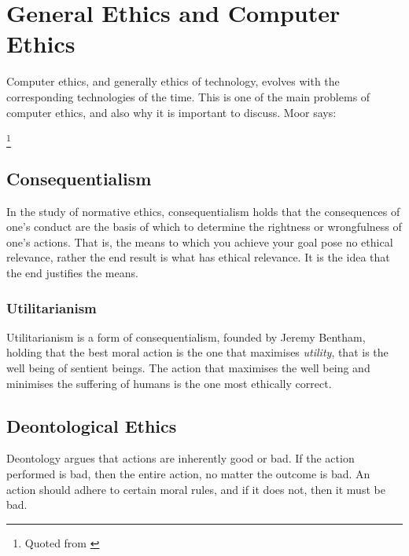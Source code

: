 \chapter{General Ethics and Computer Ethics}

Computer ethics, and generally ethics of technology, evolves with the corresponding technologies of the time. This is one of the main problems of computer ethics, and also why it is important to discuss. Moor says:

\footnote{Quoted from \cite{moor1985computer}}

\section{Consequentialism}
In the study of normative ethics, consequentialism holds that the consequences of one's conduct are the basis of which to determine the rightness or wrongfulness of one's actions. That is, the means to which you achieve your goal pose no ethical relevance, rather the end result is what has ethical relevance. It is the idea that the end justifies the means. \cite{mizzoni2009ethics}


\subsection{Utilitarianism}
Utilitarianism is a form of consequentialism, founded by Jeremy Bentham, holding that the best moral action is the one that maximises \textit{utility}, that is the well being of sentient beings. The action that maximises the well being and minimises the suffering of humans is the one most ethically correct.


\section{Deontological Ethics}
Deontology argues that actions are inherently good or bad. If the action performed is bad, then the entire action, no matter the outcome is bad. An action should adhere to certain moral rules, and if it does not, then it must be bad. 

